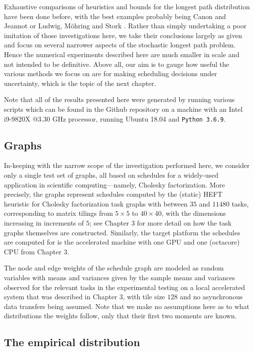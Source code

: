\documentclass[12pt]{article}
\begin{document}
Exhaustive comparisons of heuristics and bounds for the longest path distribution have been done before, with the best examples probably being Canon and Jeannot \cite{can16} or Ludwig, M{\"o}hring and Stork \cite{lud01}. Rather than simply undertaking a poor imitation of those investigations here, we take their conclusions largely as given and focus on several narrower aspects of the stochastic longest path problem. Hence the numerical experiments described here are much smaller in scale and not intended to be definitive. Above all, our aim is to gauge how useful the various methods we focus on are for making scheduling decisions under uncertainty, which is the topic of the next chapter.

Note that all of the results presented here were generated by running various scripts which can be found in the Github repository on a machine with an Intel i9-9820X @3.30 GHz processor, running Ubuntu 18.04 and {\tt Python 3.6.9}. 

\subsection{Graphs}
\label{subsect.graphs}

In-keeping with the narrow scope of the investigation performed here, we consider only a single test set of graphs, all based on schedules for a widely-used application in scientific computing---namely, Cholesky factorization. More precisely, the graphs represent schedules computed by the (static) HEFT heuristic for Cholesky factorization task graphs with between $35$ and $11480$ tasks, corresponding to matrix tilings from $5 \times 5$ to $40 \times 40$, with the dimensions increasing in increments of $5$; see Chapter 3 for more detail on how the task graphs themselves are constructed. Similarly, the target platform the schedules are computed for is the accelerated machine with one GPU and one (octacore) CPU from Chapter 3.

The node and edge weights of the schedule graph are modeled as random variables with means and variances given by the sample means and variances observed for the relevant tasks in the experimental testing on a local accelerated system that was described in Chapter 3, with tile size $128$ and no asynchronous data transfers being assumed. Note that we make no assumptions here as to what distributions the weights follow, only that their first two moments are known.  

\subsection{The empirical distribution}
\label{subsect.empirical_distribution}
\end{document}
